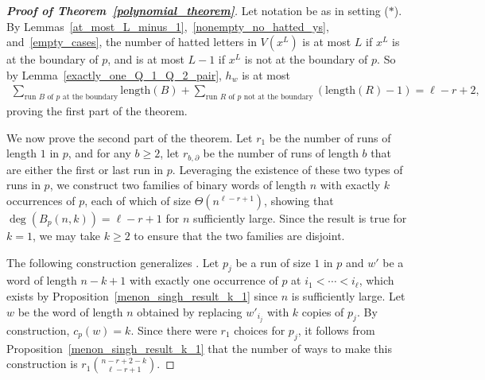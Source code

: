 \documentclass[11pt]{amsart}
\newcommand{\settingstar}{{\normalfont(\hyperref[setting_star]{$\ast$})}}
\begin{document}
\begin{proof}[\textbf{Proof of Theorem~\ref{polynomial_theorem}}]

Let notation be as in setting \settingstar. By Lemmas~\ref{at_most_L_minus_1},~\ref{nonempty_no_hatted_ys}, and~\ref{empty_cases}, the number of hatted letters in $V(x^L)$ is at most $L$ if $x^L$ is at the boundary of $p$, and is at most $L-1$ if $x^L$ is not at the boundary of $p$. So by Lemma~\ref{exactly_one_Q_1_Q_2_pair}, $h_w$ is at most
    \begin{align*}
        \sum_{\text{run $B$ of $p$ at the boundary}}\text{length}(B)+\sum_{\text{run $R$ of $p$ not at the boundary}}(\text{length}(R)-1)=\ell-r+2,
    \end{align*}
proving the first part of the theorem.


We now prove the second part of the theorem. Let $r_1$ be the number of runs of length $1$ in $p$, and for any $b\geq2$, let $r_{b,\partial}$ be the number of runs of length $b$ that are either the first or last run in $p$. Leveraging the existence of these two types of runs in $p$, we construct two families of binary words of length $n$ with exactly $k$ occurrences of $p$, each of which of size $\Theta(n^{\ell-r+1})$, showing that $\deg(B_p(n,k))=\ell-r+1$ for $n$ sufficiently large. Since the result is true for $k=1$, we may take $k\geq2$ to ensure that the two families are disjoint.

    The following construction generalizes \cite[Construction 3.1]{subseq_freq}. Let $p_j$ be a run of size $1$ in $p$ and $w'$ be a word of length $n-k+1$ with exactly one occurrence of $p$ at $i_1<\cdots<i_{\ell}$, which exists by Proposition~\ref{menon_singh_result_k_1} since $n$ is sufficiently large. Let $w$ be the word of length $n$ obtained by replacing $w'_{i_j}$ with $k$ copies of $p_j$. By construction, $c_p(w)=k$. Since there were $r_1$ choices for $p_j$, it follows from Proposition~\ref{menon_singh_result_k_1} that the number of ways to make this construction is $r_1{n-r+2-k\choose \ell-r+1}$. 


\end{proof}
\end{document}
